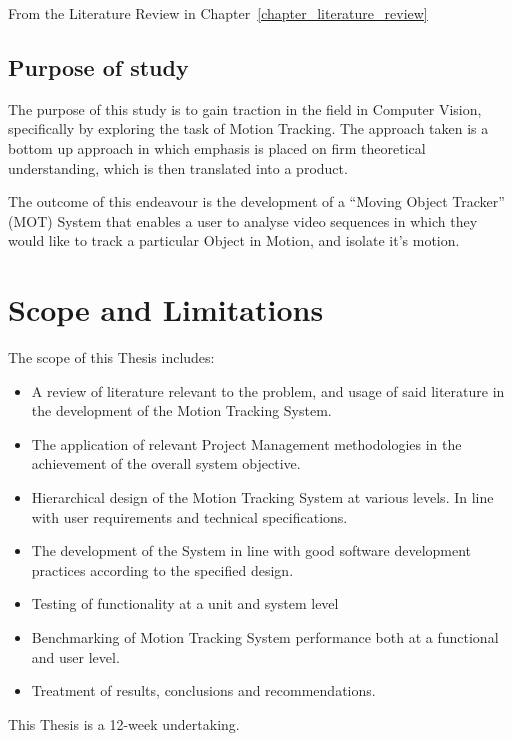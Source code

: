 From the Literature Review in Chapter~\ref{chapter_literature_review}

\subsection{Purpose of study}\label{introduction_purpose}
The purpose of this study is to gain traction in the field in Computer Vision,
specifically by exploring the task of Motion Tracking. The approach taken is a
bottom up approach in which emphasis is placed on firm theoretical
understanding, which is then translated into a product.

The outcome of this endeavour is the development of a ``Moving Object Tracker''
(MOT) System that enables a user to analyse video sequences in which they would like
to track a particular Object in Motion, and isolate it's motion.

\section{Scope and Limitations}\label{introduction_scope}
The scope of this Thesis includes: 
\begin{itemize}
    \item A review of literature relevant to the problem, and usage of
        said literature in the development of the Motion Tracking System.
    \item The application of relevant Project Management methodologies in the
        achievement of the overall system objective.
    \item Hierarchical design of the Motion Tracking System at various levels.
        In line with user requirements and technical specifications.
    \item The development of the System in line with good software development
        practices according to the specified design.
    \item Testing of functionality at a unit and system level
    \item Benchmarking of Motion Tracking System performance both at a
        functional and user level.
    \item Treatment of results, conclusions and recommendations.
\end{itemize}
This Thesis is a 12-week undertaking.

